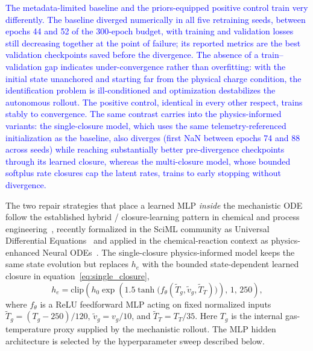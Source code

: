 \documentclass[fleqn,10pt]{wlscirep}
\newcommand{\rev}[1]{\textcolor{blue}{#1}}
\begin{document}
\rev{The metadata-limited baseline and the priors-equipped positive control train very differently. The baseline diverged numerically in all five retraining seeds, between epochs 44 and 52 of the 300-epoch budget, with training and validation losses still decreasing together at the point of failure; its reported metrics are the best validation checkpoints saved before the divergence. The absence of a train--validation gap indicates under-convergence rather than overfitting: with the initial state unanchored and starting far from the physical charge condition, the identification problem is ill-conditioned and optimization destabilizes the autonomous rollout. The positive control, identical in every other respect, trains stably to convergence. The same contrast carries into the physics-informed variants: the single-closure model, which uses the same telemetry-referenced initialization as the baseline, also diverges (first NaN between epochs 74 and 88 across seeds) while reaching substantially better pre-divergence checkpoints through its learned closure, whereas the multi-closure model, whose bounded softplus rate closures cap the latent rates, trains to early stopping without divergence.}

The two repair strategies that place a learned MLP \emph{inside} the mechanistic ODE follow the established hybrid / closure-learning pattern in chemical and process engineering~\cite{psichogios1992,vonStosch2014}, recently formalized in the SciML community as Universal Differential Equations~\cite{rackauckas2020universal} and applied in the chemical-reaction context as physics-enhanced Neural ODEs~\cite{sorourifar2023}. The single-closure physics-informed model keeps the same state evolution but replaces $h_e$ with the bounded state-dependent learned closure in equation~\eqref{eq:single_closure},
\begin{equation}\label{eq:single_closure}
h_e=\mathrm{clip}\!\left(h_0\exp\!\left(1.5\tanh\!\big(f_{\theta}(\tilde{T}_g,\tilde{v}_g,\widetilde{T}_T)\big)\right),\,1,\,250\right),
\end{equation}
where $f_{\theta}$ is a ReLU feedforward MLP acting on fixed normalized inputs $\tilde{T}_g=(T_g-250)/120$, $\tilde{v}_g=v_g/10$, and $\widetilde{T}_T=T_T/35$. Here $T_g$ is the internal gas-temperature proxy supplied by the mechanistic rollout. The MLP hidden architecture is selected by the hyperparameter sweep described below.
\end{document}
